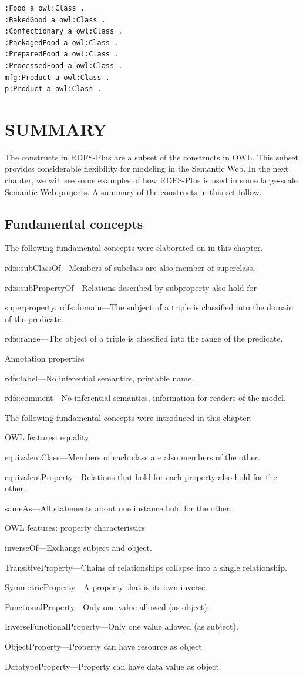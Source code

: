 \begin{lstlisting}
:Food a owl:Class .
:BakedGood a owl:Class .
:Confectionary a owl:Class .
:PackagedFood a owl:Class .
:PreparedFood a owl:Class .
:ProcessedFood a owl:Class .
mfg:Product a owl:Class .
p:Product a owl:Class .
\end{lstlisting}

\section{SUMMARY}

The constructs in RDFS-Plus are a subset of the constructs in OWL. This
subset provides considerable flexibility for modeling in the Semantic
Web. In the next chapter, we will see some examples of how RDFS-Plus is
used in some large-scale Semantic Web projects. A summary of the
constructs in this set follow.

\subsection{Fundamental concepts}

The following fundamental concepts were elaborated on in this chapter.

rdfs:subClassOf---Members of subclass are also member of superclass.

rdfs:subPropertyOf---Relations described by subproperty also hold for

superproperty. rdfs:domain---The subject of a triple is classified into
the domain of the predicate. 

rdfs:range---The object of a triple is
classified into the range of the predicate.

Annotation properties

rdfs:label---No inferential semantics, printable name.

rdfs:comment---No inferential semantics, information for readers of the
model.

The following fundamental concepts were introduced in this chapter.


OWL features: equality

equivalentClass---Members of each class are also members of the other.

equivalentProperty---Relations that hold for each property also hold for
the other. 

sameAs---All statements about one instance hold for the
other.

OWL features: property characteristics

inverseOf---Exchange subject and object.

TransitiveProperty---Chains of relationships collapse into a single
relationship.

SymmetricProperty---A property that is its own inverse.

FunctionalProperty---Only one value allowed (as object).

InverseFunctionalProperty---Only one value allowed (as subject).

ObjectProperty---Property can have resource as object.

DatatypeProperty---Property can have data value as object.

